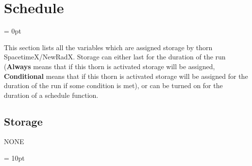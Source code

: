 
\section{Schedule} 


\parskip = 0pt


\noindent This section lists all the variables which are assigned storage by thorn SpacetimeX/NewRadX.  Storage can either last for the duration of the run ({\bf Always} means that if this thorn is activated storage will be assigned, {\bf Conditional} means that if this thorn is activated storage will be assigned for the duration of the run if some condition is met), or can be turned on for the duration of a schedule function.


\subsection*{Storage}NONE

\vspace{5mm}\parskip = 10pt 
